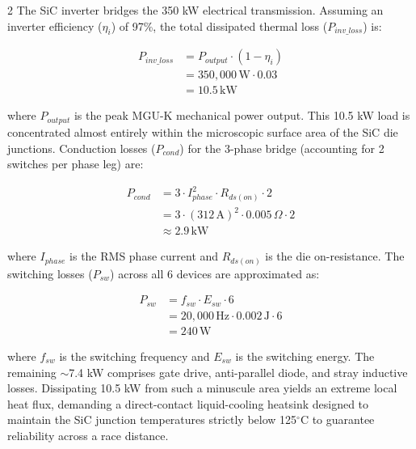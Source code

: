 \begin{multicols}{2}
The SiC inverter bridges the 350 kW electrical transmission. Assuming an inverter efficiency ($\eta_{i}$) of 97\%, the total dissipated thermal loss ($P_{inv\_loss}$) is:

\begin{equation} \label{eq:inverter_loss}
\begin{split}
P_{inv\_loss} &= P_{output} \cdot (1 - \eta_{i}) \\
&= 350,000\,\mathrm{W} \cdot 0.03 \\
&= 10.5\,\mathrm{kW}
\end{split}
\end{equation}

where $P_{output}$ is the peak MGU-K mechanical power output. This 10.5 kW load is concentrated almost entirely within the microscopic surface area of the SiC die junctions. Conduction losses ($P_{cond}$) for the 3-phase bridge (accounting for 2 switches per phase leg) are:

\begin{equation} \label{eq:inverter_cond}
\begin{split}
P_{cond} &= 3 \cdot I^2_{phase} \cdot R_{ds(on)} \cdot 2 \\
&= 3 \cdot (312\,\mathrm{A})^2 \cdot 0.005\,\Omega \cdot 2 \\
&\approx 2.9\,\mathrm{kW}
\end{split}
\end{equation}

where $I_{phase}$ is the RMS phase current and $R_{ds(on)}$ is the die on-resistance. The switching losses ($P_{sw}$) across all 6 devices are approximated as:

\begin{equation} \label{eq:inverter_sw}
\begin{split}
P_{sw} &= f_{sw} \cdot E_{sw} \cdot 6 \\
&= 20,000\,\mathrm{Hz} \cdot 0.002\,\mathrm{J} \cdot 6 \\
&= 240\,\mathrm{W}
\end{split}
\end{equation}

where $f_{sw}$ is the switching frequency and $E_{sw}$ is the switching energy. The remaining $\sim$7.4 kW comprises gate drive, anti-parallel diode, and stray inductive losses. Dissipating 10.5 kW from such a minuscule area yields an extreme local heat flux, demanding a direct-contact liquid-cooling heatsink designed to maintain the SiC junction temperatures strictly below 125$^\circ$C to guarantee reliability across a race distance.


\end{multicols}
